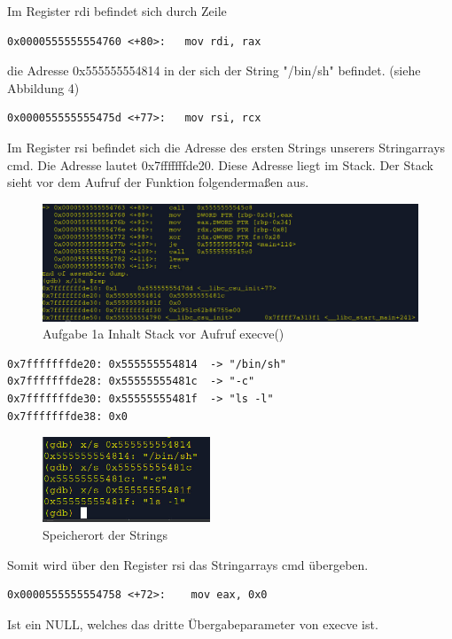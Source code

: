 \documentclass[12pt]{article}
\begin{document}
\newpage

Im Register rdi befindet sich durch 
Zeile 
\begin{lstlisting}
0x0000555555554760 <+80>:   mov rdi, rax
\end{lstlisting}
die Adresse 0x555555554814 in der sich der String "/bin/sh" befindet. (siehe Abbildung 4)
\begin{lstlisting}
0x000055555555475d <+77>:   mov rsi, rcx
\end{lstlisting} 


Im Register rsi befindet sich die Adresse
des ersten Strings unserers Stringarrays cmd.
Die Adresse lautet 0x7fffffffde20. 
Diese Adresse liegt im Stack. 
Der Stack sieht vor dem Aufruf der Funktion folgendermaßen aus.

\begin{figure}[h!]
	\includegraphics[width=15cm]{../images/Bufferoverflow_Aufgabe1a_StackVorCallExecve.jpg}
	\caption{Aufgabe 1a Inhalt Stack vor Aufruf execve()}
\end{figure}



\begin{lstlisting}
0x7fffffffde20: 0x555555554814  -> "/bin/sh"
0x7fffffffde28: 0x55555555481c	-> "-c"
0x7fffffffde30: 0x55555555481f	-> "ls -l"
0x7fffffffde38: 0x0
\end{lstlisting}
\begin{figure}[h!]
	\includegraphics[width=5cm]{../images/Bufferoverflow_Aufgabe1a_Pointeruebergabeparams.jpg}
	\caption{Speicherort der Strings}
\end{figure}
Somit wird über den Register rsi das Stringarrays cmd übergeben.

\newpage
\begin{lstlisting}
0x0000555555554758 <+72>:    mov eax, 0x0 
\end{lstlisting}
Ist ein NULL, welches das dritte Übergabeparameter von execve ist.
\end{document}
